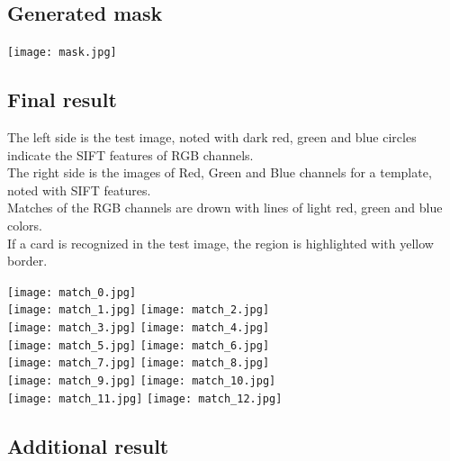 \documentclass{article}
\begin{document}
\subsection*{Generated mask}
\texttt{[image: mask.jpg]}

\subsection*{Final result}

The left side is the test image, noted with dark red, green and blue circles indicate the SIFT features of RGB channels.\\
The right side is the images of Red, Green and Blue channels for a template, noted with SIFT features.\\
Matches of the RGB channels are drown with lines of light red, green and blue colors.\\
If a card is recognized in the test image, the region is highlighted with yellow border.

\texttt{[image: match\_0.jpg]}\\
\texttt{[image: match\_1.jpg]}
\texttt{[image: match\_2.jpg]}\\
\texttt{[image: match\_3.jpg]}
\texttt{[image: match\_4.jpg]}\\
\texttt{[image: match\_5.jpg]}
\texttt{[image: match\_6.jpg]}\\
\texttt{[image: match\_7.jpg]}
\texttt{[image: match\_8.jpg]}\\
\texttt{[image: match\_9.jpg]}
\texttt{[image: match\_10.jpg]}\\
\texttt{[image: match\_11.jpg]}
\texttt{[image: match\_12.jpg]}

\subsection*{Additional result}
\end{document}
